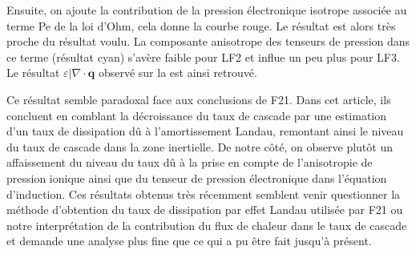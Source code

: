 Ensuite, on ajoute la contribution de la pression électronique isotrope associée au terme \acs{Pe} de la loi d'Ohm, cela donne la courbe rouge. Le résultat est alors très proche du résultat voulu. La composante anisotrope des tenseurs de pression dans ce terme (résultat cyan) s'avère faible pour LF2 et influe un peu plus pour LF3. Le résultat  $\varepsilon|\nabla \cdot \boldsymbol{q}$ observé sur la 
est ainsi retrouvé.

Ce résultat semble paradoxal face aux conclusions de \ac{F21}. Dans cet article, ils concluent en comblant la décroissance du taux de cascade par une estimation d'un taux de dissipation dû à l'amortissement Landau, remontant ainsi le niveau du taux de cascade dans la zone inertielle. De notre côté, on observe plutôt un affaissement du niveau du taux dû à la prise en compte de l'anisotropie de pression ionique ainsi que du tenseur de pression électronique dans l'équation d'induction. Ces résultats obtenus très récemment semblent venir questionner la méthode d'obtention du taux de dissipation par effet Landau utilisée par \ac{F21} ou notre interprétation de la contribution du flux de chaleur dans le taux de cascade et demande une analyse plus fine que ce qui a pu être fait jusqu'à présent. 

